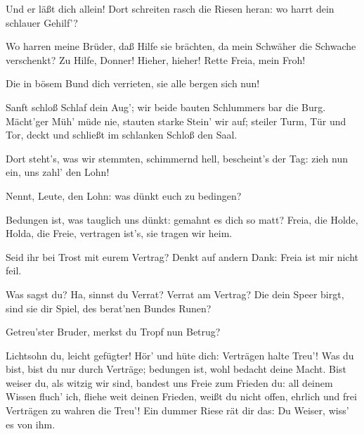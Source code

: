 \begin{drama}
\Frickaspeaks
Und er läßt dich allein!
Dort schreiten rasch die Riesen heran:
wo harrt dein schlauer Gehilf'?
 

\Freiaspeaks
Wo harren meine Brüder, daß Hilfe sie brächten,
da mein Schwäher die Schwache verschenkt?
Zu Hilfe, Donner! Hieher, hieher!
Rette Freia, mein Froh!
 

\Frickaspeaks
Die in bösem Bund dich verrieten,
sie alle bergen sich nun!
 




\Fasoltspeaks
Sanft schloß Schlaf dein Aug';
wir beide bauten Schlummers bar die Burg.
Mächt'ger Müh' müde nie,
stauten starke Stein' wir auf;
steiler Turm, Tür und Tor,
deckt und schließt im schlanken Schloß den Saal.
 



Dort steht's, was wir stemmten,
schimmernd hell, bescheint's der Tag:
zieh nun ein, uns zahl' den Lohn!
 

\Wotanspeaks
Nennt, Leute, den Lohn:
was dünkt euch zu bedingen?
 

\Fasoltspeaks
Bedungen ist, was tauglich uns dünkt:
gemahnt es dich so matt?
Freia, die Holde, Holda, die Freie,
vertragen ist's, sie tragen wir heim.
 

\Wotanspeaks


Seid ihr bei Trost mit eurem Vertrag?
Denkt auf andern Dank: Freia ist mir nicht feil.
 

\Fasoltspeaks


Was sagst du? Ha, sinnst du Verrat?
Verrat am Vertrag? Die dein Speer birgt,
sind sie dir Spiel, des berat'nen Bundes Runen?
 

\Fafnerspeaks


Getreu'ster Bruder,
merkst du Tropf nun Betrug?
 

\Fasoltspeaks
Lichtsohn du, leicht gefügter!
Hör' und hüte dich: Verträgen halte Treu'!
Was du bist, bist du nur durch Verträge;
bedungen ist, wohl bedacht deine Macht.
Bist weiser du, als witzig wir sind,
bandest uns Freie zum Frieden du:
all deinem Wissen fluch' ich,
fliehe weit deinen Frieden,
weißt du nicht offen, ehrlich und frei
Verträgen zu wahren die Treu'!
Ein dummer Riese rät dir das:
Du Weiser, wiss' es von ihm.
 


\end{drama}
